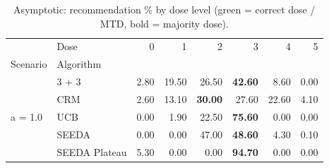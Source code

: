 \begin{table}[H]
\centering
\caption{Asymptotic: recommendation \% by dose level (green = correct dose / MTD, bold = majority dose).}
\label{tab:asym_rec_by_dose}
\begin{tabular}{llrrrrrr}
\toprule
 & Dose & 0 & 1 & 2 & 3 & 4 & 5 \\
Scenario & Algorithm &  &  &  &  &  &  \\
\midrule
\multirow[c]{5}{*}{a = 1.0} & 3 + 3 & 2.80 & 19.50 & {\cellcolor[HTML]{C8E6C9}} 26.50 & \bfseries 42.60 & 8.60 & 0.00 \\
 & CRM & 2.60 & 13.10 & {\cellcolor[HTML]{C8E6C9}} \bfseries 30.00 & 27.60 & 22.60 & 4.10 \\
 & UCB & 0.00 & 1.90 & {\cellcolor[HTML]{C8E6C9}} 22.50 & \bfseries 75.60 & 0.00 & 0.00 \\
 & SEEDA & 0.00 & 0.00 & {\cellcolor[HTML]{C8E6C9}} 47.00 & \bfseries 48.60 & 4.30 & 0.10 \\
 & SEEDA Plateau & 5.30 & 0.00 & {\cellcolor[HTML]{C8E6C9}} 0.00 & \bfseries 94.70 & 0.00 & 0.00 \\
\bottomrule
\end{tabular}
\end{table}
